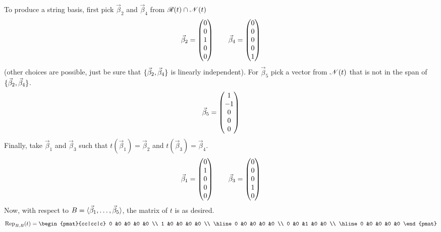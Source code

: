 To produce a string basis, first
pick \( \vec{\beta}_2 \) and \( \vec{\beta}_4 \) from
\( \mathscr{R}(t)\cap\mathscr{N}(t) \)
\begin{equation*}
  \vec{\beta}_2=\begin{pmatrix} 0 \\ 0 \\ 1 \\ 0 \\ 0 \end{pmatrix}\qquad
  \vec{\beta}_4=\begin{pmatrix} 0 \\ 0 \\ 0 \\ 0 \\ 1 \end{pmatrix}
\end{equation*}
(other choices are possible, just be sure that 
\( \mbox{$\{\vec{\beta}_2,\vec{\beta}_4\}$} \) is linearly independent).
For \( \vec{\beta}_5 \) pick a vector from \( \mathscr{N}(t) \)
that is not in the span of \( \mbox{$\{ \vec{\beta}_2,\vec{\beta}_4 \}$} \).
\begin{equation*}
  \vec{\beta}_5=\begin{pmatrix} 1 \\ -1 \\ 0 \\ 0 \\ 0 \end{pmatrix}
\end{equation*}
Finally, take \( \vec{\beta}_1 \) and \( \vec{\beta}_3 \) such that
\( t(\vec{\beta}_1)=\vec{\beta}_2 \) and
\( t(\vec{\beta}_3)=\vec{\beta}_4 \).
\begin{equation*}
  \vec{\beta}_1=\begin{pmatrix} 0 \\ 1 \\ 0 \\ 0 \\ 0 \end{pmatrix}\qquad
  \vec{\beta}_3=\begin{pmatrix} 0 \\ 0 \\ 0 \\ 1 \\ 0 \end{pmatrix}
\end{equation*}
Now, with respect to \( B=\langle\vec{\beta}_1,\ldots,\vec{\beta}_5\rangle \),
the matrix of $t$ is as desired.
\begin{equation*}
  \rep{t}{B,B}=
  \begin{pmat}{cc|cc|c}
    0  &0  &0  &0  &0  \\
    1  &0  &0  &0  &0  \\  \hline
    0  &0  &0  &0  &0  \\
    0  &0  &1  &0  &0  \\  \hline
    0  &0  &0  &0  &0
  \end{pmat}
\end{equation*}

